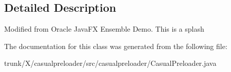 \subsection{Detailed Description}
Modified from Oracle Java\-F\-X Ensemble Demo. This is a splash 

The documentation for this class was generated from the following file\-:\begin{DoxyCompactItemize}
\item 
trunk/\-X/casualpreloader/src/casualpreloader/Casual\-Preloader.\-java\end{DoxyCompactItemize}
